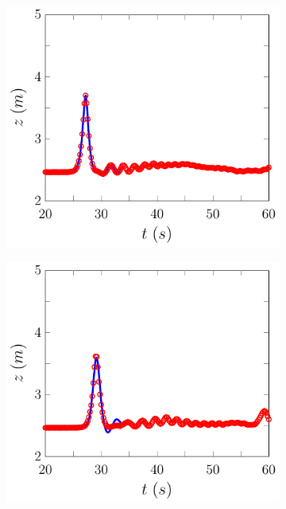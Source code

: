 \begin{figure}
	\centering
	\begin{subfigure}{0.5\textwidth}
		\includegraphics[width=\textwidth]{./chp6/figures/Experiment/Roeber/Trial8/FDVM/WG1-figure0.pdf}
		\vspace{0.5cm}
	\end{subfigure}%
	\begin{subfigure}{0.5\textwidth}
		\includegraphics[width=\textwidth]{./chp6/figures/Experiment/Roeber/Trial8/FDVM/WG2-figure0.pdf}

\end{subfigure}
\end{figure}
